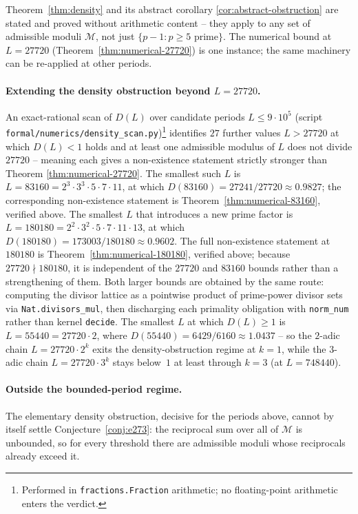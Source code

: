 \documentclass[11pt,a4paper]{article}
\theoremstyle{plain}
\theoremstyle{definition}
\theoremstyle{remark}
\begin{document}
Theorem~\ref{thm:density} and its abstract corollary
\ref{cor:abstract-obstruction} are stated and proved without
arithmetic content -- they apply to any set of admissible moduli
$\mathcal{M}$, not just $\{p - 1 : p \geq 5 \text{ prime}\}$. The
numerical bound at $L = 27720$
(Theorem~\ref{thm:numerical-27720}) is one instance; the same
machinery can be re-applied at other periods.

\paragraph{Extending the density obstruction beyond $L = 27720$.}
An exact-rational scan of $D(L)$ over candidate periods $L \leq 9
\cdot 10^5$ (script
\texttt{formal/numerics/density\_scan.py})\footnote{Performed in
\texttt{fractions.Fraction} arithmetic; no floating-point
arithmetic enters the verdict.} identifies $27$ further values
$L > 27720$ at which $D(L) < 1$ holds and at least one admissible
modulus of $L$ does not divide $27720$ -- meaning each gives a
non-existence statement strictly stronger than Theorem
\ref{thm:numerical-27720}. The smallest such $L$ is $L = 83160 =
2^3 \cdot 3^3 \cdot 5 \cdot 7 \cdot 11$, at which $D(83160) =
27241/27720 \approx 0.9827$; the corresponding non-existence
statement is Theorem~\ref{thm:numerical-83160}, verified above. The
smallest $L$ that introduces a new prime factor is $L = 180180 =
2^2 \cdot 3^2 \cdot 5 \cdot 7 \cdot 11 \cdot 13$, at which
$D(180180) = 173003/180180 \approx 0.9602$. The full non-existence
statement at $180180$ is Theorem~\ref{thm:numerical-180180}, verified
above; because $27720 \nmid 180180$, it is independent of the $27720$
and $83160$ bounds rather than a strengthening of them. Both larger
bounds are obtained by the same route: computing the divisor lattice
as a pointwise product of prime-power divisor sets via
\texttt{Nat.divisors\_mul}, then discharging each primality obligation
with \texttt{norm\_num} rather than kernel \texttt{decide}. The
smallest $L$ at which $D(L) \geq 1$ is $L = 55440 = 27720 \cdot 2$,
where $D(55440) = 6429/6160 \approx 1.0437$ -- so the $2$-adic
chain $L = 27720 \cdot 2^k$ exits the density-obstruction regime
at $k = 1$, while the $3$-adic chain
$L = 27720 \cdot 3^k$ stays below~$1$ at least through $k = 3$
(at $L = 748440$).

\paragraph{Outside the bounded-period regime.}
The elementary density obstruction, decisive for the periods above,
cannot by itself settle Conjecture~\ref{conj:e273}: the reciprocal
sum over all of $\mathcal{M}$ is unbounded, so for every threshold
there are admissible moduli whose reciprocals already exceed it.
\end{document}
